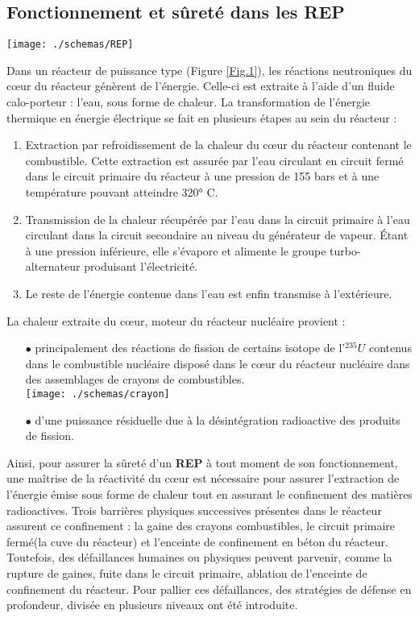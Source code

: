 \documentclass[11pt,a4paper]{scrartcl}%
\begin{document}
	\subsection{Fonctionnement et sûreté dans les \textbf{REP}}
	\texttt{[image: ./schemas/REP]}\\
	\label{Fig.1}
	
	
	Dans un réacteur de puissance type  (Figure \ref{Fig.1}), les réactions neutroniques du cœur du réacteur génèrent de l'énergie. Celle-ci est extraite à l'aide d'un fluide calo-porteur : l'eau, sous forme de chaleur. La transformation de l'énergie thermique en énergie électrique se fait en plusieurs étapes au sein du réacteur :
	\begin{enumerate}
		\item Extraction par refroidissement de la chaleur du cœur du réacteur contenant le combustible. Cette extraction est assurée par l'eau circulant en circuit fermé dans le circuit primaire du réacteur à une pression de 155 bars et à une température pouvant atteindre 320° C. 
		\item Transmission de la chaleur récupérée par l'eau dans la circuit primaire à l'eau circulant dans la circuit secondaire au niveau du générateur de vapeur. Étant à une pression inférieure, elle s'évapore et alimente le groupe turbo-alternateur produisant l'électricité.
		\item Le reste de l'énergie contenue dans l'eau est enfin transmise à l'extérieure.
	\end{enumerate}
	La chaleur extraite du cœur, moteur du réacteur nucléaire provient :
	\begin{itemize}
		\item [$\bullet$] principalement des réactions de fission de certains isotope de l'$^{235}U$ contenus dans le combustible nucléaire disposé dans le cœur du réacteur nucléaire dans des assemblages de crayons de combustibles.\\
		\texttt{[image: ./schemas/crayon]}\\
		\label{Fig.2}
		\item [$\bullet$] d'une puissance résiduelle due à la désintégration radioactive des produits de fission. 
	\end{itemize}
	Ainsi, pour assurer la sûreté d'un \textbf{REP} à tout moment de son fonctionnement, une maîtrise de la réactivité du cœur est nécessaire pour assurer l'extraction de l'énergie émise sous forme de chaleur tout en assurant le confinement des matières radioactives. Trois barrières physiques successives présentes dans le réacteur assurent ce confinement : la gaine des crayons combustibles, le circuit primaire fermé(la cuve du réacteur) et l'enceinte de confinement en béton du réacteur. Toutefois, des défaillances humaines ou physiques peuvent parvenir, comme la rupture de gaines, fuite dans le circuit primaire, ablation de l'enceinte de confinement du réacteur. Pour pallier ces défaillances, des stratégies de défense en profondeur, divisée en plusieurs niveaux ont été introduite.  \\
\end{document}
